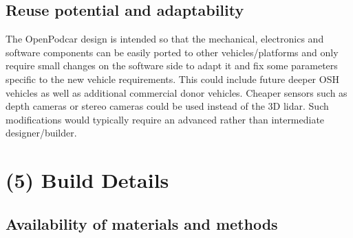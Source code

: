 \documentclass[a4paper]{article}
\begin{document}
	
	\subsection{Reuse potential and adaptability}\label{h.6wkumyl0ejrh}
	
	The OpenPodcar design is intended so that the mechanical, electronics and software components can be easily ported to other vehicles/platforms and only require small changes on the software side to adapt it and fix some parameters specific to the new vehicle requirements. This could include future deeper OSH vehicles as well as additional commercial donor vehicles. Cheaper sensors such as depth cameras or stereo cameras could be used instead of the 3D lidar. Such modifications would typically require an advanced rather than intermediate designer/builder.
	
	
	
	
	
	
	\section{(5) Build Details}\label{h.l8i9vokvs0bj}
	
	\subsection{Availability of materials and methods}\label{h.60suejv0jlzi}
	
	
\end{document}
